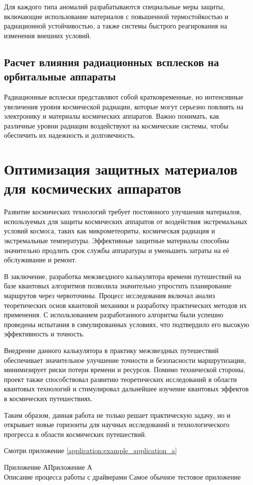 \documentclass[]{../vvsu}
\begin{document}
Для каждого типа аномалий разрабатываются специальные меры защиты, включающие использование материалов с повышенной термостойкостью и радиационной устойчивостью, а также системы быстрого реагирования на изменения внешних условий.

\subsection{Расчет влияния радиационных всплесков на орбитальные аппараты}

Радиационные всплески представляют собой кратковременные, но интенсивные увеличения уровня космической радиации, которые могут серьезно повлиять на электронику и материалы космических аппаратов. Важно понимать, как различные уровни радиации воздействуют на космические системы, чтобы обеспечить их надежность и долговечность.

\pagebreak
\section{Оптимизация защитных материалов для космических аппаратов}

Развитие космических технологий требует постоянного улучшения материалов, используемых для защиты космических аппаратов от воздействия экстремальных условий космоса, таких как микрометеориты, космическая радиация и экстремальные температуры. Эффективные защитные материалы способны значительно продлить срок службы аппаратуры и уменьшить затраты на её обслуживание и ремонт.

\clearpage
\begin{conclusion}
  В заключение, разработка межзвездного калькулятора времени путешествий на базе квантовых алгоритмов позволила значительно упростить планирование маршрутов через червоточины. Процесс исследования включал анализ теоретических основ квантовой механики и разработку практических методов их применения. С использованием разработанного алгоритма были успешно проведены испытания в симулированных условиях, что подтвердило его высокую эффективность и точность.

  Внедрение данного калькулятора в практику межзвездных путешествий обеспечивает значительное улучшение точности и безопасности маршрутизации, минимизирует риски потери времени и ресурсов. Помимо технической стороны, проект также способствовал развитию теоретических исследований в области квантовых технологий и стимулировал дальнейшее изучение квантовых эффектов в космических путешествиях.

  Таким образом, данная работа не только решает практическую задачу, но и открывает новые горизонты для научных исследований и технологического прогресса в области космических путешествий.

  Смотри приложение \ref{application:example_application_a}
\end{conclusion}


\begin{application}{Приложение А}{Приложение А\\ \vspace{1em} Описание процесса работы с драйверами}
  Самое обычное тестовое приложение
\end{application}
\end{document}
